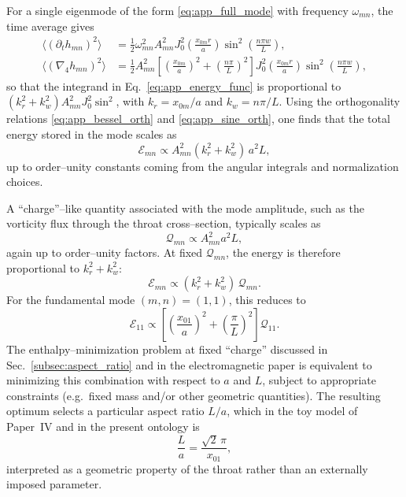 \documentclass[12pt]{article}
\begin{document}
For a single eigenmode of the form \eqref{eq:app_full_mode} with frequency
$\omega_{mn}$, the time average gives
\begin{align}
  \langle(\partial_t h_{mn})^2\rangle
  &= \frac{1}{2}\omega_{mn}^2 A_{mn}^2
     J_0^2\!\left(\frac{x_{0m} r}{a}\right)
     \sin^2\!\left(\frac{n\pi w}{L}\right),
  \\
  \langle(\nabla_4 h_{mn})^2\rangle
  &= \frac{1}{2} A_{mn}^2
     \left[
       \left(\frac{x_{0m}}{a}\right)^2
       + \left(\frac{n\pi}{L}\right)^2
     \right]
     J_0^2\!\left(\frac{x_{0m} r}{a}\right)
     \sin^2\!\left(\frac{n\pi w}{L}\right),
\end{align}
so that the integrand in Eq.~\eqref{eq:app_energy_func} is proportional to
$(k_r^2+k_w^2)A_{mn}^2 J_0^2 \sin^2$, with $k_r=x_{0m}/a$ and
$k_w=n\pi/L$.  Using the orthogonality relations
\eqref{eq:app_bessel_orth} and \eqref{eq:app_sine_orth}, one finds that the
total energy stored in the mode scales as
\begin{equation}
  \mathcal{E}_{mn}
  \propto A_{mn}^2 (k_r^2 + k_w^2)\,a^2 L,
\end{equation}
up to order--unity constants coming from the angular integrals and
normalization choices.

A ``charge''--like quantity associated with the mode amplitude, such as the
vorticity flux through the throat cross--section, typically scales as
\begin{equation}
  \mathcal{Q}_{mn}
  \propto A_{mn}^2 a^2 L,
\end{equation}
again up to order--unity factors.  At fixed $\mathcal{Q}_{mn}$, the energy
is therefore proportional to $k_r^2 + k_w^2$:
\begin{equation}
  \mathcal{E}_{mn}
  \propto (k_r^2 + k_w^2)\,\mathcal{Q}_{mn}.
\end{equation}
For the fundamental mode $(m,n)=(1,1)$, this reduces to
\begin{equation}
  \mathcal{E}_{11}
  \propto
    \left[
      \left(\frac{x_{01}}{a}\right)^2
      + \left(\frac{\pi}{L}\right)^2
    \right]\mathcal{Q}_{11}.
\end{equation}
The enthalpy--minimization problem at fixed ``charge'' discussed in
Sec.~\ref{subsec:aspect_ratio} and in the electromagnetic paper is
equivalent to minimizing this combination with respect to $a$ and $L$, subject
to appropriate constraints (e.g.\ fixed mass and/or other geometric
quantities).  The resulting optimum selects a particular aspect ratio
$L/a$, which in the toy model of Paper~IV and in the present ontology is
\begin{equation}
  \frac{L}{a}
  = \frac{\sqrt{2}\,\pi}{x_{01}},
\end{equation}
interpreted as a geometric property of the throat rather than an externally
imposed parameter.
\end{document}
